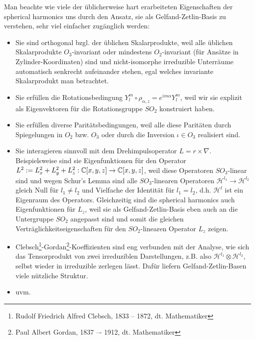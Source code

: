\begin{remark}
Man beachte wie viele der üblicherweise hart erarbeiteten Eigenschaften der spherical harmonics uns durch den Ansatz, sie als Gelfand-Zetlin-Basis zu verstehen, sehr viel einfacher zugänglich werden:
\begin{itemize}
\item Sie sind orthogonal bzgl. der üblichen Skalarprodukte, weil alle üblichen Skalarprodukte $O_3$-invariant oder mindestens $O_2$-invariant (für Ansätze in Zylinder-Koordinaten) sind und nicht-isomorphe irreduzible Unterräume automatisch senkrecht aufeinander stehen, egal welches invariante Skalarprodukt man betrachtet.
\item Sie erfüllen die Rotationsbedingung $Y_l^m\circ \rho_{\alpha,z} = e^{im\alpha} Y_l^m$, weil wir sie explizit als Eigenvektoren für die Rotationsgruppe $SO_2$ konstruiert haben.
\item Sie erfüllen diverse Paritätsbedingungen, weil alle diese Paritäten durch Spiegelungen in $O_2$ bzw. $O_3$ oder durch die Inversion $\iota\in O_3$ realisiert sind.
\item Sie interagieren sinnvoll mit dem Drehimpulsoperator $L=r\times\nabla$. Beispielsweise sind sie Eigenfunktionen für den Operator $L^2:=L_x^2+L_y^2+L_z^2 : \mathbb{C}[x,y,z]\to\mathbb{C}[x,y,z]$, weil diese Operatoren $SO_3$-linear sind und wegen Schur's Lemma sind alle $SO_3$-linearen Operatoren $\mathscr{H}^{l_1} \to \mathscr{H}^{l_2}$ gleich Null für $l_1\neq l_2$ und Vielfache der Identität für $l_1=l_2$, d.h. $\mathscr{H}^l$ ist ein Eigenraum des Operators. Gleichzeitig sind die spherical harmonics auch Eigenfunktionen für $L_z$, weil sie als Gelfand-Zetlin-Basis eben auch an die Untergruppe $SO_2$ angepasst sind und somit die gleichen Verträglichkeitseigenschaften für den $SO_2$-linearen Operator $L_z$ zeigen.
\item Clebsch\footnote{Rudolf Friedrich Alfred Clebsch, 1833 -- 1872, dt. Mathematiker}-Gordan\footnote{Paul Albert Gordan, 1837 –- 1912, dt. Mathematiker}-Koeffizienten sind eng verbunden mit der Analyse, wie sich das Tensorprodukt von zwei irreduziblen Darstellungen, z.B. also $\mathscr{H}^{l_1}\otimes\mathscr{H}^{l_2}$, selbst wieder in irreduzible zerlegen lässt. Dafür liefern Gelfand-Zetlin-Basen viele nützliche Struktur.
\item uvm.
\end{itemize}
\end{remark}